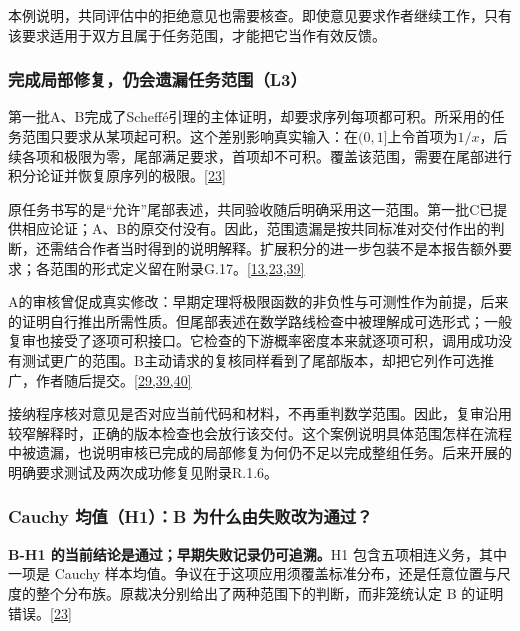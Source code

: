 本例说明，共同评估中的拒绝意见也需要核查。即使意见要求作者继续工作，只有该要求适用于双方且属于任务范围，才能把它当作有效反馈。

\subsubsection[完成局部修复，仍会遗漏任务范围（L3）]{\texorpdfstring{\protect\hypertarget{r1-2}{}完成局部修复，仍会遗漏任务范围（L3）}{完成局部修复，仍会遗漏任务范围（L3）}}
第一批A、B完成了Scheffé引理的主体证明，却要求序列每项都可积。所采用的任务范围只要求从某项起可积。这个差别影响真实输入：在$(0,1]$上令首项为$1/x$，后续各项和极限为零，尾部满足要求，首项却不可积。覆盖该范围，需要在尾部进行积分论证并恢复原序列的极限。\href{zh.pdf\#ref-23}{\mbox{[23]}}

原任务书写的是“允许”尾部表述，共同验收随后明确采用这一范围。第一批C已提供相应论证；A、B的原交付没有。因此，范围遗漏是按共同标准对交付作出的判断，还需结合作者当时得到的说明解释。扩展积分的进一步包装不是本报告额外要求；各范围的形式定义留在附录G.17。\href{zh.pdf\#ref-13}{\mbox{[13,23,39]}}

A的审核曾促成真实修改：早期定理将极限函数的非负性与可测性作为前提，后来的证明自行推出所需性质。但尾部表述在数学路线检查中被理解成可选形式；一般复审也接受了逐项可积接口。它检查的下游概率密度本来就逐项可积，调用成功没有测试更广的范围。B主动请求的复核同样看到了尾部版本，却把它列作可选推广，作者随后提交。\href{zh.pdf\#ref-29}{\mbox{[29,39,40]}}

接纳程序核对意见是否对应当前代码和材料，不再重判数学范围。因此，复审沿用较窄解释时，正确的版本检查也会放行该交付。这个案例说明具体范围怎样在流程中被遗漏，也说明审核已完成的局部修复为何仍不足以完成整组任务。后来开展的明确要求测试及两次成功修复见附录R.1.6。

\subsubsection[Cauchy 均值（H1）：B 为什么由失败改为通过？]{\texorpdfstring{\protect\hypertarget{r1-3}{}Cauchy 均值（H1）：B 为什么由失败改为通过？}{Cauchy 均值（H1）：B 为什么由失败改为通过？}}
\textbf{B-H1 的当前结论是通过；早期失败记录仍可追溯。}H1 包含五项相连义务，其中一项是 Cauchy 样本均值。争议在于这项应用须覆盖标准分布，还是任意位置与尺度的整个分布族。原裁决分别给出了两种范围下的判断，而非笼统认定 B 的证明错误。\href{zh.pdf\#ref-23}{\mbox{[23]}}

